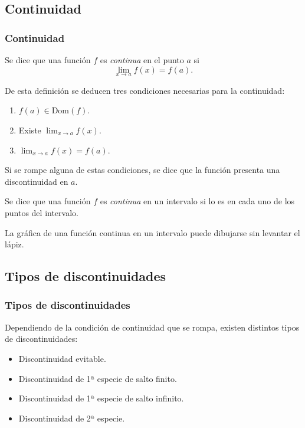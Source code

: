 	\subsection{Continuidad}
	\begin{frame}
		\frametitle{Continuidad}
		\begin{definicion}
			Se dice que una función $f$ es \emph{continua} en el punto $a$ si
			\[ \lim_{x\rightarrow a}f(x)=f(a).\]
		\end{definicion}
		
		De esta definición se deducen tres condiciones necesarias para la continuidad:
		\begin{enumerate}
			\item  $f(a)\in \textrm{Dom}(f)$.
			\item  Existe $\displaystyle \lim_{x\rightarrow a}f(x)$.
			\item  $\displaystyle \lim_{x\rightarrow a}f(x)=f(a)$.
		\end{enumerate}
		
		Si se rompe alguna de estas condiciones, se dice que la función presenta una discontinuidad en $a$.
		
		\begin{definicion}
			Se dice que una función $f$ es \emph{continua} en un intervalo si lo es en cada uno de los puntos del intervalo.
		\end{definicion}
		
		La gráfica de una función continua en un intervalo puede dibujarse sin levantar el lápiz.
	\end{frame}
	
	
	
	\subsection{Tipos de discontinuidades}
	\begin{frame}
		\frametitle{Tipos de discontinuidades}
		Dependiendo de la condición de continuidad que se rompa, existen distintos tipos de  discontinuidades:
		\begin{itemize}
			\item Discontinuidad evitable.
			\item Discontinuidad de 1ª especie de salto finito.
			\item Discontinuidad de 1ª especie de salto infinito.
			\item Discontinuidad de 2ª especie.
		\end{itemize}
	\end{frame}
	
